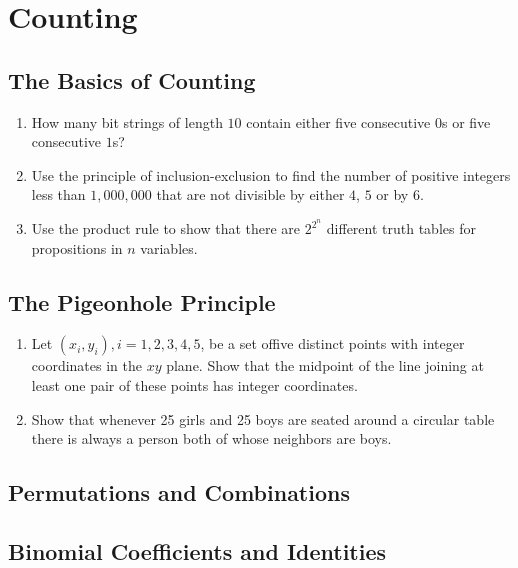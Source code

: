 \documentclass{sig-alternate-05-2015}
\begin{document}
\section{Counting}
\subsection{The Basics of Counting}
\begin{enumerate}
	\item How many bit strings of length $10$ contain either five consecutive
	$0$s or five consecutive $1$s?

	\item Use the principle of inclusion-exclusion to find the number
	of positive integers less than $1,000,000$ that are not
	divisible by either $4$, $5$ or by $6$.
	
	\item Use the product rul{\tiny }e to show that there are $2^{2^n}$
	different truth tables for propositions in $n$ variables.

\end{enumerate}
\subsection{The Pigeonhole Principle}
\begin{enumerate}
	\item Let $(x_i, y_i), i = 1, 2, 3, 4, 5$, be a set offive distinct points with integer coordinates in the $xy$ plane. Show that the
	midpoint of the line joining at least one pair of these points has integer coordinates.
	
	\item Show that whenever 25 girls and 25 boys are seated around a circular table there is always a person both of whose neighbors are boys.
\end{enumerate}
\subsection{Permutations and Combinations}
\subsection{Binomial Coefficients and Identities}
\end{document}
